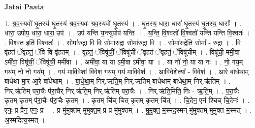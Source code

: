 \documentclass[17pt]{extarticle}
\begin{document}
\textbf{Jatai Paata} \newline

1. श्र॒व॒स्यवो॑ घृ॒तस्य॑ घृ॒तस्य॑ श्रव॒स्यवः॑ श्रव॒स्यवो॑ घृ॒तस्य॑ । . घृ॒तस्य॒ धारा॒ धारा॑ घृ॒तस्य॑ घृ॒तस्य॒ धाराः᳚ । . धारा॒ उपोप॒ धारा॒ धारा॒ उप॑ । . उप॑ यन्ति य॒न्त्युपोप॑ यन्ति । . य॒न्ति॒ वि॒श्वतो॑ वि॒श्वतो॑ यन्ति यन्ति वि॒श्वतः॑ । . वि॒श्वत॒ इति॑ वि॒श्वतः॑ । . सोमा॑रुद्रा॒ वि वि सोमा॑रुद्रा॒ सोमा॑रुद्रा॒ वि । . सोमा॑रु॒द्रेति॒ सोमा᳚ - रु॒द्रा॒ । . वि वृ॑हतं ॅवृहतं॒ ॅवि वि वृ॑हतम् । . वृ॒ह॒तं॒ ॅविषू॑चीं॒ ॅविषू॑चीं ॅवृहतं ॅवृहतं॒ ॅविषू॑चीम् । . विषू॑ची॒ ममी॒वा ऽमी॑वा॒ विषू॑चीं॒ ॅविषू॑ची॒ ममी॑वा । . अमी॑वा॒ या या ऽमी॒वा ऽमी॑वा॒ या । . या नो॑ नो॒ या या नः॑ । . नो॒ गय॒म् गय॑म् नो नो॒ गय᳚म् । . गय॑ मावि॒वेशा॑ वि॒वेश॒ गय॒म् गय॑ मावि॒वेश॑ । . आ॒वि॒वेशेत्या᳚ - वि॒वेश॑ । . आ॒रे बा॑धेथाम् बाधेथा मा॒र आ॒रे बा॑धेथाम् । . बा॒धे॒था॒म् निर्.ऋ॑ति॒म् निर्.ऋ॑तिम् बाधेथाम् बाधेथा॒म् निर्.ऋ॑तिम् । . निर्.ऋ॑तिम् परा॒चैः प॑रा॒चैर् निर्.ऋ॑ति॒म् निर्.ऋ॑तिम् परा॒चैः । . निर्.ऋ॑ति॒मिति॒ निः - ऋ॒ति॒म् । . प॒रा॒चैः कृ॒तम् कृ॒तम् प॑रा॒चैः प॑रा॒चैः कृ॒तम् । . कृ॒तम् चि॑च् चित् कृ॒तम् कृ॒तम् चि॑त् । . चि॒देन॒ एन॑ श्चिच् चि॒देनः॑ । . एनः॒ प्र प्रैन॒ एनः॒ प्र । . प्र मु॑मुक्तम् मुमुक्त॒म् प्र प्र मु॑मुक्तम् । . मु॒मु॒क्त॒ म॒स्मद॒स्मन् मु॑मुक्तम् मुमुक्त म॒स्मत् । . अ॒स्मदित्य॒स्मत् । \newline
\end{document}
